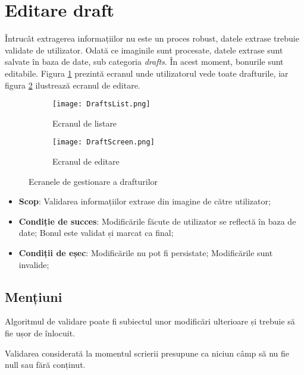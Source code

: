 \section{Editare draft}\label{editare-draft}

Întrucât extragerea informațiilor nu este un proces robust, datele extrase trebuie validate de utilizator. Odată ce imaginile sunt procesate, datele extrase sunt salvate în baza de date, sub categoria \emph{drafts}. În acest moment, bonurile sunt editabile. Figura \ref{fig:draftList} prezintă ecranul unde utilizatorul vede toate drafturile, iar figura \ref{fig:draftScreen} ilustrează ecranul de editare.

\begin{figure}[!ht]
  \centering
  \begin{subfigure}{0.49\textwidth}
    \centering
    \texttt{[image: DraftsList.png]}
    \caption{Ecranul de listare}
    \label{fig:draftList}
  \end{subfigure}
  \begin{subfigure}{0.49\textwidth}
    \centering
    \texttt{[image: DraftScreen.png]}
    \caption{Ecranul de editare}
    \label{fig:draftScreen}
  \end{subfigure}
  \caption{Ecranele de gestionare a drafturilor}
  \label{fig:drafts}
\end{figure}

\begin{itemize}
\item
  \textbf{Scop}: Validarea informațiilor extrase din imagine de către utilizator;
\item
  \textbf{Condiție de succes}: Modificările făcute de utilizator se reflectă în baza de date; Bonul este validat și marcat ca final;
\item
  \textbf{Condiții de eșec}: Modificările nu pot fi persistate; Modificările sunt invalide;
\end{itemize}

\subsection*{Mențiuni}

Algoritmul de validare poate fi subiectul unor modificări ulterioare și trebuie să fie ușor de înlocuit.

Validarea considerată la momentul scrierii presupune ca niciun câmp să nu fie null sau fără conținut.

